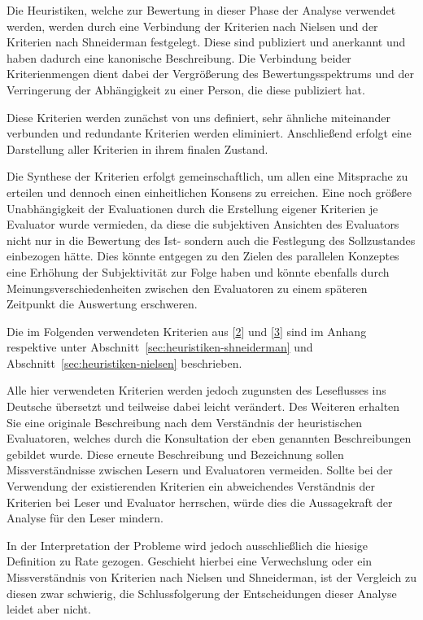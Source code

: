 \documentclass[
  12pt,
  ngerman,
  a4paper,
]{article}
\begin{document}
Die Heuristiken, welche zur Bewertung in dieser Phase der Analyse
verwendet werden, werden durch eine Verbindung der Kriterien nach
Nielsen und der Kriterien nach Shneiderman festgelegt. Diese sind
publiziert und anerkannt und haben dadurch eine kanonische Beschreibung.
Die Verbindung beider Kriterienmengen dient dabei der Vergrößerung des
Bewertungsspektrums und der Verringerung der Abhängigkeit zu einer
Person, die diese publiziert hat.

Diese Kriterien werden zunächst von uns definiert, sehr ähnliche
miteinander verbunden und redundante Kriterien werden eliminiert.
Anschließend erfolgt eine Darstellung aller Kriterien in ihrem finalen
Zustand.

Die Synthese der Kriterien erfolgt gemeinschaftlich, um allen eine
Mitsprache zu erteilen und dennoch einen einheitlichen Konsens zu
erreichen. Eine noch größere Unabhängigkeit der Evaluationen durch die
Erstellung eigener Kriterien je Evaluator wurde vermieden, da diese die
subjektiven Ansichten des Evaluators nicht nur in die Bewertung des Ist-
sondern auch die Festlegung des Sollzustandes einbezogen hätte. Dies
könnte entgegen zu den Zielen des parallelen Konzeptes eine Erhöhung der
Subjektivität zur Folge haben und könnte ebenfalls durch
Meinungsverschiedenheiten zwischen den Evaluatoren zu einem späteren
Zeitpunkt die Auswertung erschweren.

Die im Folgenden verwendeten Kriterien aus
{[}\protect\hyperlink{ref-heur:shneiderman}{2}{]} und
{[}\protect\hyperlink{ref-heur:nielsen}{3}{]} sind im Anhang respektive
unter Abschnitt~\ref{sec:heuristiken-shneiderman} und
Abschnitt~\ref{sec:heuristiken-nielsen} beschrieben.

Alle hier verwendeten Kriterien werden jedoch zugunsten des Leseflusses
ins Deutsche übersetzt und teilweise dabei leicht verändert. Des
Weiteren erhalten Sie eine originale Beschreibung nach dem Verständnis
der heuristischen Evaluatoren, welches durch die Konsultation der eben
genannten Beschreibungen gebildet wurde. Diese erneute Beschreibung und
Bezeichnung sollen Missverständnisse zwischen Lesern und Evaluatoren
vermeiden. Sollte bei der Verwendung der existierenden Kriterien ein
abweichendes Verständnis der Kriterien bei Leser und Evaluator
herrschen, würde dies die Aussagekraft der Analyse für den Leser
mindern.

In der Interpretation der Probleme wird jedoch ausschließlich die
hiesige Definition zu Rate gezogen. Geschieht hierbei eine Verwechslung
oder ein Missverständnis von Kriterien nach Nielsen und Shneiderman, ist
der Vergleich zu diesen zwar schwierig, die Schlussfolgerung der
Entscheidungen dieser Analyse leidet aber nicht.
\end{document}
